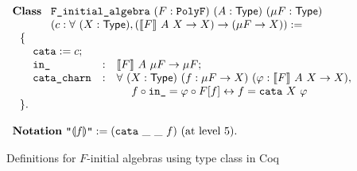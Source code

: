 \documentclass[runningheads, orivec]{llncs}
\begin{document}
\begin{figure}[t]
\[
\begin{array}{l}
\mathbf{Class}~\begin{array}[t]{l}
\verb~F_initial_algebra~~(F : \verb~PolyF~)~(A : \mathsf{Type})~(\mu F : \mathsf{Type}) \\
(c : \forall ~ (X : \mathsf{Type}), (\llbracket F \rrbracket ~ A ~ X \to X) \to ( \mu F \to X) ) := 
\end{array} \\
~~\{\\
~~~~\begin{array}{lll}
\verb~cata~ := c; \\
\verb~in_~ &:& \llbracket F \rrbracket ~ A ~ \mu F \to \mu F ; \\
\verb~cata_charn~ &:& \forall ~ (X : \mathsf{Type})~(f : \mu F \to X)~ (\varphi : \llbracket F \rrbracket ~ A ~ X \to X),\\
&&~~~~ f \circ \verb~in_~ = \varphi \circ F[f] \leftrightarrow f = \verb~cata~~X~\varphi
\end{array}\\
~~\}.\\
\\
\mathbf{Notation}~\verb~"~\llparenthesis f \rrparenthesis\verb~"~ := (\verb~cata~~\_~\_~f)~(\text{at level 5}).
\end{array}
\]

\caption{Definitions for \( F \)-initial algebras using type class in Coq}
\label{fig:f_initial_alg}
\end{figure}
\end{document}
